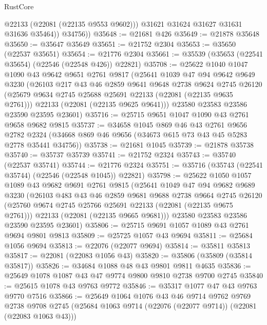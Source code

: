 \begin{lexlean}{RustCore}
\begin{coremodule}
              @22133
              (@22081 (@22135 @9553 @9602)))
            @31621
            @31624
            @31627
            @31631
            @31636
            @35464))
        @34756))
@35648 := @21681 @426
@35649 := @21878 @35648
@35650 := @35647 @35649
@35651 := @21752 @2304
@35653 := @35650 (@22537 @35651)
@35654 := @21776 @2304
@35661 := @35539 (@35653 (@22541 @35654) (@22546 (@22548 @426)) @22821)
@35708 := @25622
    @1040
    @1047
    @1090
    @43
    @9642
    @9651
    @2761
    @9817
    (@25641
      @1039
      @47
      @94
      @9642
      @9649
      @3230
      (@26103
        @217
        @43
        @46
        @2859
        @9641
        @9648
        @2738
        @9624
        @2745
        @26120
        (@25679 @9634 @2745 @25688 @25691 @22133 (@22081 (@22135 @9635 @2761)))
        @22133
        (@22081 (@22135 @9625 @9641)))
      @23580
      @23583
      @23586
      @23590
      @23595
      @23601)
@35716 := @25715 @9651 @1047 @1090 @43 @2761 @9658 @9682 @9815
@35737 := @34658
    @1045
    @869
    @46
    @43
    @2761
    @9656
    @2782
    @2324
    (@34668 @869 @46 @9656 (@34673 @615 @73 @43 @45 @5283 @2778 @35441 @34756))
@35738 := @21681 @1045
@35739 := @21878 @35738
@35740 := @35737 @35739
@35741 := @21752 @2324
@35743 := @35740 (@22537 @35741)
@35744 := @21776 @2324
@35751 := @35716 (@35743 (@22541 @35744) (@22546 (@22548 @1045)) @22821)
@35798 := @25622
    @1050
    @1057
    @1089
    @43
    @9682
    @9691
    @2761
    @9815
    (@25641
      @1049
      @47
      @94
      @9682
      @9689
      @3230
      (@26103
        @483
        @43
        @46
        @2859
        @9681
        @9688
        @2738
        @9664
        @2745
        @26120
        (@25760 @9674 @2745 @25766 @25691 @22133 (@22081 (@22135 @9675 @2761)))
        @22133
        (@22081 (@22135 @9665 @9681)))
      @23580
      @23583
      @23586
      @23590
      @23595
      @23601)
@35806 := @25715 @9691 @1057 @1089 @43 @2761 @9694 @9801 @9813
@35809 := @25725 @1057 @43 @9694
@35811 := @25684 @1056 @9694
@35813 := @22076 (@22077 @9694)
@35814 := @35811 @35813
@35817 := @22081 (@22083 @1056 @43)
@35820 := @35806 (@35809 (@35814 @35817))
@35826 := @34684 @1088 @48 @43 @9801 @9811 @4635
@35836 := @25649 @1078 @1087 @43 @47 @9774 @9800 @9810 @2738 @9700 @2745
@35840 := @25615 @1078 @43 @9763 @9772
@35846 := @35317 @1077 @47 @43 @9763 @9770 @7516
@35866 := @25649
    @1064
    @1076
    @43
    @46
    @9714
    @9762
    @9769
    @2738
    @9708
    @2745
    (@25684 @1063 @9714 (@22076 (@22077 @9714)) (@22081 (@22083 @1063 @43)))

\end{coremodule}
\end{lexlean}
